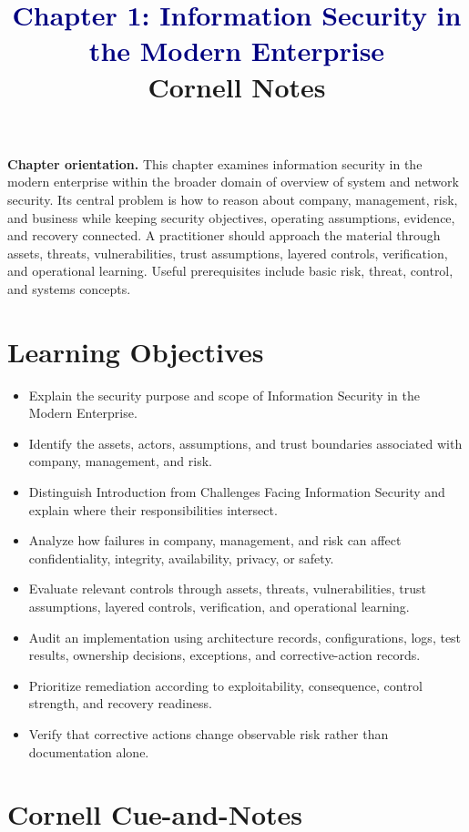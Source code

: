 \documentclass[11pt]{article}
\title{\textcolor{Navy}{Chapter 1: Information Security in the Modern Enterprise}\\[2mm]\large Cornell Notes}
\author{}
\date{}
\begin{document}
\maketitle
\thispagestyle{fancy}
\vspace{-1.5em}
\begin{orientationbox}
\textbf{Chapter orientation.} This chapter examines information security in the modern enterprise within the broader domain of overview of system and network security. Its central problem is how to reason about company, management, risk, and business while keeping security objectives, operating assumptions, evidence, and recovery connected. A practitioner should approach the material through assets, threats, vulnerabilities, trust assumptions, layered controls, verification, and operational learning. Useful prerequisites include basic risk, threat, control, and systems concepts.
\end{orientationbox}
\section*{Learning Objectives}
\begin{itemize}
\item Explain the security purpose and scope of Information Security in the Modern Enterprise.
\item Identify the assets, actors, assumptions, and trust boundaries associated with company, management, and risk.
\item Distinguish Introduction from Challenges Facing Information Security and explain where their responsibilities intersect.
\item Analyze how failures in company, management, and risk can affect confidentiality, integrity, availability, privacy, or safety.
\item Evaluate relevant controls through assets, threats, vulnerabilities, trust assumptions, layered controls, verification, and operational learning.
\item Audit an implementation using architecture records, configurations, logs, test results, ownership decisions, exceptions, and corrective-action records.
\item Prioritize remediation according to exploitability, consequence, control strength, and recovery readiness.
\item Verify that corrective actions change observable risk rather than documentation alone.
\end{itemize}
\section*{Cornell Cue-and-Notes}
\end{document}
